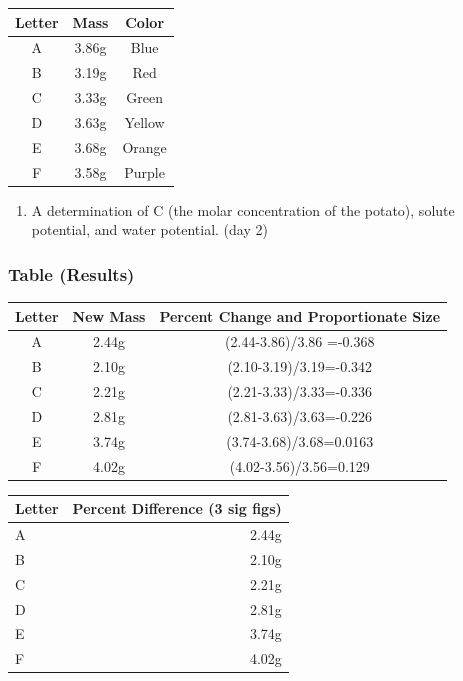 \documentclass[letterpaper]{article}
\def\tightlist{}
\begin{document}
\begin{doublespace}
\begin{longtable}[]{@{}ccc@{}}
\toprule\noalign{}
Letter & Mass & Color \\
\midrule\noalign{}
\endhead
\bottomrule\noalign{}
\endlastfoot
A & 3.86g & Blue \\
B & 3.19g & Red \\
C & 3.33g & Green \\
D & 3.63g & Yellow \\
E & 3.68g & Orange \\
F & 3.58g & Purple \\
\end{longtable}

\begin{enumerate}
\def\labelenumi{\arabic{enumi}.}
\setcounter{enumi}{3}
\tightlist
\item
  A determination of C (the molar concentration of the potato), solute potential, and water potential. (day 2)
\end{enumerate}

\subsubsection*{Table (Results)}\label{table-results}

\begin{longtable}[]{@{}ccc@{}}
\toprule\noalign{}
Letter & New Mass & Percent Change and Proportionate Size \\
\midrule\noalign{}
\endhead
\bottomrule\noalign{}
\endlastfoot
A & 2.44g & (2.44-3.86)/3.86 =-0.368 \\
B & 2.10g & (2.10-3.19)/3.19=-0.342 \\
C & 2.21g & (2.21-3.33)/3.33=-0.336 \\
D & 2.81g & (2.81-3.63)/3.63=-0.226 \\
E & 3.74g & (3.74-3.68)/3.68=0.0163 \\
F & 4.02g & (4.02-3.56)/3.56=0.129 \\
\end{longtable}

\begin{longtable}[]{@{}lr@{}}
\toprule\noalign{}
Letter & Percent Difference (3 sig figs) \\
\midrule\noalign{}
\endhead
\bottomrule\noalign{}
\endlastfoot
A & 2.44g \\
B & 2.10g \\
C & 2.21g \\
D & 2.81g \\
E & 3.74g \\
F & 4.02g \\
\end{longtable}


\end{doublespace}
\end{document}
